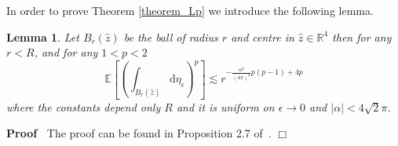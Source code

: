 \documentclass[a4paper,10pt]{article}
\newcommand{\mathd}{\mathrm{d}}
\newenvironment{proof}{\noindent\textbf{Proof\ }}{\hspace*{\fill}$\Box$\medskip}
\newtheorem{lemma}{Lemma}
\begin{document}
In order to prove Theorem \ref{theorem_Lp} we introduce the following lemma.

\begin{lemma}
  \label{lemma_garban}Let $B_r (\hat{z})$ be the ball of radius $r$ and centre
  in $\hat{z} \in \mathbb{R}^4$ then for any $r < R$, and for any $1 < p < 2$
  \[ \mathbb{E} \left[ \left( \int_{B_r (\hat{z})} \mathd \eta_{\epsilon}
     \right)^p \right] \lesssim r^{- \frac{\alpha^2}{(4 \pi)^2} p (p - 1) + 4
     p} \]
  where the constants depend only $R$ and it is uniform on $\epsilon
  \rightarrow 0$ and $| \alpha | < 4 \sqrt{2} \pi$.
\end{lemma}

\begin{proof}
  The proof can be found in Proposition 2.7 of~{\cite{Vargas2010}}.
\end{proof}
\end{document}
